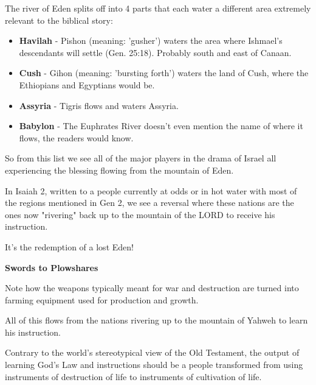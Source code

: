 \documentclass[11pt]{article}
\begin{document}
The river of Eden splits off into 4 parts that each water a different area extremely relevant to the biblical story:
\begin{itemize}
    \item \textbf{Havilah} - Pishon (meaning: 'gusher') waters the area where Ishmael's descendants will settle (Gen. 25:18). Probably south and east of Canaan.
    \item \textbf{Cush} - Gihon (meaning: 'bursting forth') waters the land of Cush, where the Ethiopians and Egyptians would be.
    \item \textbf{Assyria} - Tigris flows and waters Assyria.
    \item \textbf{Babylon} - The Euphrates River doesn't even mention the name of where it flows, the readers would know.
\end{itemize}

So from this list we see all of the major players in the drama of Israel all experiencing the blessing flowing from the mountain of Eden.

In Isaiah 2, written to a people currently at odds or in hot water with most of the regions mentioned in Gen 2, we see a reversal where these nations are the ones
now "rivering" back up to the mountain of the LORD to receive his instruction.

It's the redemption of a lost Eden!


\vspace{3em}
{\large\bfseries Swords to Plowshares}
\vspace{1em}

Note how the weapons typically meant for war and destruction are turned into farming equipment
used for production and growth.

All of this flows from the nations rivering up to the mountain of Yahweh to learn his instruction.

{\vspace{1em}}

Contrary to the world's stereotypical view of the Old Testament, the output of learning God's Law and instructions
should be a people transformed from using instruments of destruction of life to instruments of cultivation of life.

\begin{thesauce}

\end{thesauce}
\end{document}
